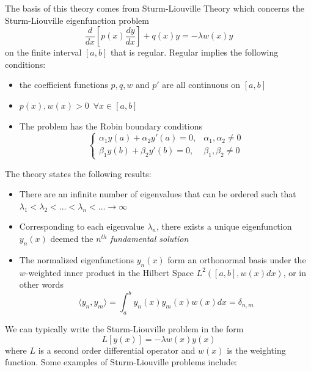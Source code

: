 \documentclass{report}
\theoremstyle{definition}
\theoremstyle{remark}
\newcommand{\od}[2]{\frac{d #1}{d#2}}
\begin{document}
 The basis of this theory comes from Sturm-Liouville Theory which concerns the Sturm-Liouville eigenfunction problem 
 \begin{equation*}
     \od{}{x}\left[ p(x)\od{y}{x}\right]+q(x)y=-\lambda w(x)y
 \end{equation*}
 on the finite interval $[a,b]$ that is regular. Regular implies the following conditions: 
 \begin{itemize}
     \item the coefficient functions $p,q,w$ and $p'$ are all continuous on $[a,b]$
     \item $p(x),w(x)>0 \,\,\,\forall x\in [a,b]$
     \item The problem has the Robin boundary conditions 
     \begin{equation*}
         \begin{cases}
             \alpha_1y(a)+\alpha_2y'(a) = 0, &\alpha_1,\alpha_2 \neq 0\\ \beta_1y(b)+\beta_2y'(b)=0, &\beta_1,\beta_2\neq 0
         \end{cases}
     \end{equation*}
 \end{itemize}
 The theory states the following results:
 \begin{itemize}
     \item There are an infinite number of eigenvalues that can be ordered such that $\lambda_1<\lambda_2<\ldots<\lambda_n<\ldots\rightarrow \infty$
     \item Corresponding to each eigenvalue $\lambda_n$, there exists a unique eigenfunction $y_n(x)$ deemed the $n^{th}$ \textit{fundamental solution}
     \item The normalized eigenfunctions $y_n(x)$ form an orthonormal basis under the $w$-weighted inner product in the Hilbert Space $L^2([a,b],w(x)dx)$, or in other words
     \begin{equation*}
         \langle y_n, y_m\rangle =\int^b_ay_n(x)y_m(x)w(x)dx = \delta_{n,m}
     \end{equation*}
 \end{itemize}
 We can typically write the Sturm-Liouville problem in the form 
 \begin{equation*}
     L[y(x)]=-\lambda w(x) y(x)
 \end{equation*}
where $L$ is a second order differential operator and $w(x)$ is the weighting function. Some examples of Sturm-Liouville problems include:
\end{document}
